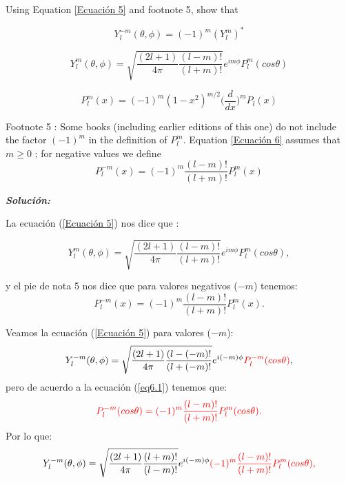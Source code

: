 \documentclass[10pt]{article}
\begin{document}
\medskip
\begin{tcolorbox}[colback=gray!10, colframe=black, title=Problem 6]

Using Equation \ref{Ecuación 5} and footnote 5, show that

$$
Y_{l}^{-m}(\theta,\phi)= (-1)^{m} \left(  Y_{l}^{m}\right)^{*} 
$$

\begin{equation}
    Y_{l}^{m}(\theta,\phi)=\sqrt{\frac{(2l+1)}{4\pi}\frac{(l-m)!}{(l+m)!}}e^{im\phi}P_{l}^{m}(cos\theta)
    \label{Ecuación 5}
\end{equation}

\begin{equation}
    P_{l}^{m}(x)=(-1)^{m}(1-x^{2})^{m/2}\bigg(\frac{d}{dx}\bigg)^{m}P_{l}(x)
    \label{Ecuación 6}
\end{equation}

Footnote 5 :
Some books (including earlier editions of this one) do not include the factor $(-1)^{m}$ in the definition of $P_{l}^{m}$. Equation \ref{Ecuación 6} assumes that $m\geq  0$
; for negative values we define $$P_{l}^{-m}(x)=(-1)^{m}\frac{(l-m)!}{(l+m)!}P_{l}^{m}(x)$$

\end{tcolorbox}
\medskip

\Large{\textit{\textbf{Solución:}}}

\medskip

La ecuación (\ref{Ecuación 5}) nos dice que :

$$
Y_{l}^{m}(\theta,\phi)=\sqrt{
\frac{(2l+1)}{4\pi}\frac{(l-m)!}{(l+m)!}}e^{im\phi}P_{l}^{m}(cos\theta),
$$

y el pie de nota 5 nos dice que para valores negativos ($-m$) tenemos:
\begin{equation}
    P_{l}^{-m}(x)=(-1)^{m}\frac{(l-m)!}{(l+m)!}P_{l}^{m}(x).
    \label{eq6.1}
\end{equation}


Veamos la ecuación (\ref{Ecuación 5}) para valores ($-m$):
$$
Y_{l}^{-m}(\theta,\phi)=\sqrt{
\frac{(2l+1)}{4\pi}\frac{(l-(-m)!}{(l+(-m)!}}e^{
    i(-m)\phi}{\color{Red} P_{l}^{-m}(cos\theta)},
$$
pero de acuerdo a la ecuación (\ref{eq6.1}) tenemos que:
$$
\color{Red} P_{l}^{-m}(cos\theta)=
(-1)^{m}\frac{(l-m)!}{(l+m)!}P_{l}^{m}(cos\theta).
$$
Por lo que:
$$
Y_{l}^{-m}(\theta,\phi)=\sqrt{
\frac{(2l+1)}{4\pi}\frac{(l+m)!}{(l-m)!}}e^{
    i(-m)\phi}\color{Red} 
    {(-1)^{m}\frac{(l-m)!}{(l+m)!}P_{l}^{m}(cos\theta)},
$$
\end{document}
